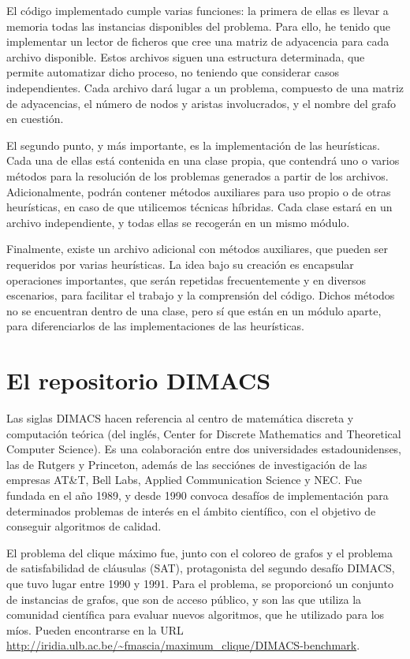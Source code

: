 El código implementado cumple varias funciones: la primera de ellas es llevar a
memoria todas las instancias disponibles del problema. Para ello, he tenido que
implementar un lector de ficheros que cree una matriz de adyacencia para cada archivo
disponible. Estos archivos siguen una estructura determinada, que permite
automatizar dicho proceso, no teniendo que considerar casos independientes.
Cada archivo dará lugar a un problema, compuesto de una matriz de adyacencias,
el número de nodos y aristas involucrados, y el nombre del grafo en cuestión.

El segundo punto, y más importante, es la implementación de las heurísticas.
Cada una de ellas está contenida en una clase propia, que contendrá uno o varios
métodos para la resolución de los problemas generados a partir de los archivos.
Adicionalmente, podrán contener métodos auxiliares para uso propio o de otras
heurísticas, en caso de que utilicemos técnicas híbridas. Cada clase estará
en un archivo independiente, y todas ellas se recogerán en un mismo módulo.

Finalmente, existe un archivo adicional con métodos auxiliares, que pueden ser
requeridos por varias heurísticas. La idea bajo su creación es encapsular
operaciones importantes, que serán repetidas frecuentemente y en diversos
escenarios, para facilitar el trabajo y la comprensión del código. Dichos
métodos no se encuentran dentro de una clase, pero sí que están en un
módulo aparte, para diferenciarlos de las implementaciones de las heurísticas.


\section{El repositorio DIMACS}
Las siglas DIMACS hacen referencia al centro de matemática discreta y computación
teórica (del inglés, Center for Discrete Mathematics and Theoretical Computer Science).
Es una colaboración entre dos universidades estadounidenses, las de Rutgers y Princeton,
además de las secciónes de investigación de las empresas AT\&T, Bell Labs, Applied
Communication Science y NEC. Fue fundada en el año 1989, y desde 1990 convoca desafíos
de implementación para determinados problemas de interés en el ámbito científico, con
el objetivo de conseguir algoritmos de calidad.

El problema del clique máximo fue, junto con el coloreo de grafos y el problema de satisfabilidad
de cláusulas (SAT), protagonista del segundo desafío DIMACS, que tuvo lugar entre 1990 y 1991.
Para el problema, se proporcionó un conjunto de instancias de grafos, que son de acceso público,
y son las que utiliza la comunidad científica para evaluar nuevos algoritmos, que he utilizado
para los míos. Pueden encontrarse en la URL \url{http://iridia.ulb.ac.be/~fmascia/maximum_clique/DIMACS-benchmark}.

